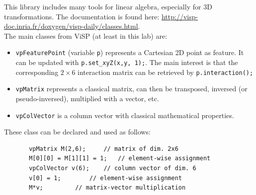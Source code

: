\documentclass{ecnreport}
\begin{document}
This library includes many tools for linear algebra, especially for 3D transformations. 
The documentation is found here: \url{http://visp-doc.inria.fr/doxygen/visp-daily/classes.html}.\\
The main classes from ViSP (at least in this lab) are:
\begin{itemize}
\item \texttt{vpFeaturePoint} (variable \texttt{p}) represents a Cartesian 2D point as feature. It can be updated with \texttt{p.set\_xyZ(x,y, 1);}. The main interest is that the corresponding $2\times 6$ interaction matrix can be retrieved by \texttt{p.interaction();}
\item \texttt{vpMatrix} represents a classical matrix, can then be transposed, inversed (or pseudo-inversed), multiplied with a vector, etc.
\item \texttt{vpColVector} is a column vector with classical mathematical properties.
\end{itemize}
These class can be declared and used as follows:
\begin{center}\cppstyle
\begin{lstlisting}
       vpMatrix M(2,6); 	// matrix of dim. 2x6
       M[0][0] = M[1][1] = 1;	// element-wise assignment
       vpColVector v(6);	// column vector of dim. 6
       v[0] = 1;		// element-wise assignment
       M*v;			// matrix-vector multiplication
\end{lstlisting}
\end{center}
%
%
\end{document}
